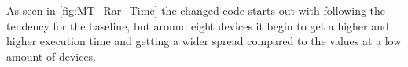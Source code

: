As seen in \autoref{fig:MT_Rar_Time} the changed code starts out with following the tendency for the baseline, but around eight devices it begin to get a higher and higher execution time and getting a wider spread compared to the values at a low amount of devices. 

